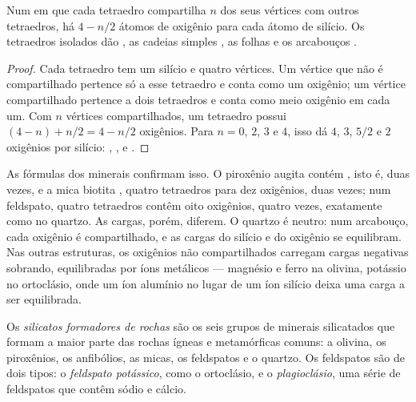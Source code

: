 
\begin{proposition}\label{prop:g11:minerals:sharing}
Num  em que cada tetraedro compartilha $n$ dos seus vértices com
outros tetraedros, há $4 - n/2$ átomos de oxigênio para cada átomo de
silício. Os tetraedros isolados dão , as cadeias simples
, as folhas  e os arcabouços .
\end{proposition}

\begin{proof}
Cada tetraedro tem um silício e quatro vértices. Um vértice que não é
compartilhado pertence só a esse tetraedro e conta como um oxigênio; um
vértice compartilhado pertence a dois tetraedros e conta como meio oxigênio
em cada um. Com $n$ vértices compartilhados, um tetraedro possui
$(4 - n) + n/2 = 4 - n/2$ oxigênios. Para $n = 0$, $2$, $3$ e $4$, isso dá
$4$, $3$, $5/2$ e $2$ oxigênios por silício: , ,
 e .
\end{proof}

As fórmulas dos minerais confirmam isso. O piroxênio augita contém
, isto é,  duas vezes, e a mica biotita
, quatro tetraedros para dez oxigênios,  duas vezes;
num feldspato, quatro tetraedros contêm oito oxigênios,  quatro
vezes, exatamente como no quartzo. As cargas, porém, diferem. O quartzo é
neutro: num arcabouço, cada oxigênio é compartilhado, e as cargas do silício
e do oxigênio se equilibram. Nas outras estruturas, os oxigênios não
compartilhados carregam cargas negativas sobrando, equilibradas por íons
metálicos --- magnésio e ferro na olivina, potássio no ortoclásio, onde um
íon alumínio  no lugar de um íon silício  deixa uma
carga a ser equilibrada.

\begin{definition}\label{def:g11:minerals:rock-forming}
Os \emph{silicatos formadores de rochas}
são os seis grupos de minerais silicatados que formam a maior parte das
rochas ígneas e metamórficas comuns: a olivina, os piroxênios, os
anfibólios, as micas, os feldspatos e o quartzo. Os feldspatos são de dois
tipos: o \emph{feldspato potássico}, como o ortoclásio, e o
\emph{plagioclásio}, uma série de feldspatos que contêm sódio e cálcio.
\end{definition}

